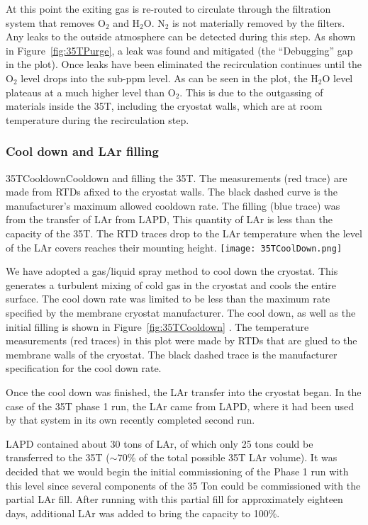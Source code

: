 At this point the exiting gas is re-routed to circulate through the filtration system that removes O$_2$ and H$_2$O. N$_2$ is not materially removed by the filters. Any leaks to the outside atmosphere can be detected during this step. As shown in Figure~\ref{fig:35TPurge}, a leak was found and mitigated (the ``Debugging'' gap in the plot). Once leaks have been eliminated the recirculation continues until the O$_2$ level drops into the sub-ppm level. As can be seen in the plot, the H$_2$O level plateaus at a much higher level than O$_2$. This is due to the outgassing of materials inside the 35T, including the cryostat walls, which are at room temperature during the recirculation step. 

\subsubsection {Cool down and LAr filling}

\begin{cdrfigure}{35TCooldown}{Cooldown and filling the 35T. The 
measurements (red trace) are made from RTDs afixed to the cryostat walls. The black dashed curve is the 
manufacturer's maximum allowed cooldown rate. The filling (blue trace) was from the transfer of LAr 
from LAPD, This quantity of LAr is less than the capacity of the 35T. The RTD traces drop to the LAr 
temperature when the level of the LAr covers reaches their mounting height.}
  \texttt{[image: 35TCoolDown.png]}
\end{cdrfigure}

We have adopted a gas/liquid spray method to cool down the cryostat. This generates a turbulent mixing 
of cold gas in the cryostat and cools the entire surface. The cool down rate was limited to be less than 
the maximum rate specified by the membrane cryostat manufacturer. The cool down, as well as the initial 
filling is shown in Figure~\ref{fig:35TCooldown} . The temperature measurements (red traces) in this plot 
were made by RTDs that are glued to the membrane walls of the cryostat. The black dashed trace is the 
manufacturer specification for the cool down rate.

Once the cool down was finished, the LAr transfer into the cryostat began. In the case of the 35T phase 1 
run, the LAr came from LAPD, where it had been used by that system in its own recently completed 
second run\cite{bib:lapdP07005}. 

LAPD contained about 30 tons of LAr, of which only 25 tons could be transferred to the 35T ($\sim$70\% of 
the total possible 35T LAr volume). It was decided that we would begin the initial commissioning of the 
Phase 1 run with this level since several components of the 35 Ton could be commissioned with the 
partial LAr fill. After running with this partial fill for approximately eighteen days, additional LAr was 
added to bring the capacity to 100\%. 

